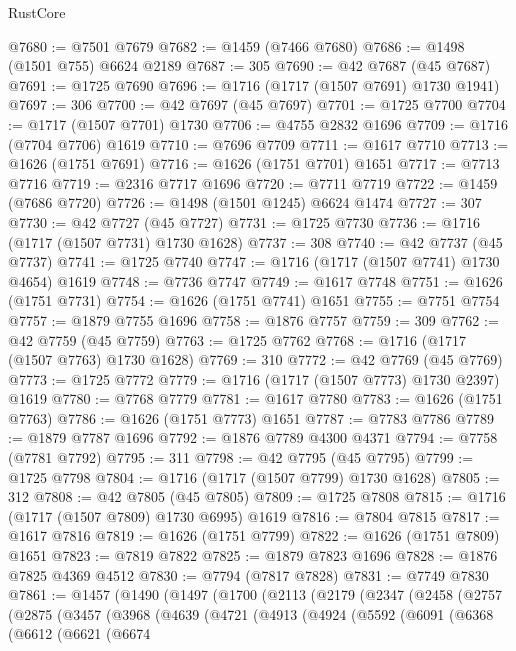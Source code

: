 \begin{lexlean}{RustCore}
\begin{coremodule}
@7680 := @7501 @7679
@7682 := @1459 (@7466 @7680)
@7686 := @1498 (@1501 @755) @6624 @2189
@7687 := 305
@7690 := @42 @7687 (@45 @7687)
@7691 := @1725 @7690
@7696 := @1716 (@1717 (@1507 @7691) @1730 @1941)
@7697 := 306
@7700 := @42 @7697 (@45 @7697)
@7701 := @1725 @7700
@7704 := @1717 (@1507 @7701) @1730
@7706 := @4755 @2832 @1696
@7709 := @1716 (@7704 @7706) @1619
@7710 := @7696 @7709
@7711 := @1617 @7710
@7713 := @1626 (@1751 @7691)
@7716 := @1626 (@1751 @7701) @1651
@7717 := @7713 @7716
@7719 := @2316 @7717 @1696
@7720 := @7711 @7719
@7722 := @1459 (@7686 @7720)
@7726 := @1498 (@1501 @1245) @6624 @1474
@7727 := 307
@7730 := @42 @7727 (@45 @7727)
@7731 := @1725 @7730
@7736 := @1716 (@1717 (@1507 @7731) @1730 @1628)
@7737 := 308
@7740 := @42 @7737 (@45 @7737)
@7741 := @1725 @7740
@7747 := @1716 (@1717 (@1507 @7741) @1730 @4654) @1619
@7748 := @7736 @7747
@7749 := @1617 @7748
@7751 := @1626 (@1751 @7731)
@7754 := @1626 (@1751 @7741) @1651
@7755 := @7751 @7754
@7757 := @1879 @7755 @1696
@7758 := @1876 @7757
@7759 := 309
@7762 := @42 @7759 (@45 @7759)
@7763 := @1725 @7762
@7768 := @1716 (@1717 (@1507 @7763) @1730 @1628)
@7769 := 310
@7772 := @42 @7769 (@45 @7769)
@7773 := @1725 @7772
@7779 := @1716 (@1717 (@1507 @7773) @1730 @2397) @1619
@7780 := @7768 @7779
@7781 := @1617 @7780
@7783 := @1626 (@1751 @7763)
@7786 := @1626 (@1751 @7773) @1651
@7787 := @7783 @7786
@7789 := @1879 @7787 @1696
@7792 := @1876 @7789 @4300 @4371
@7794 := @7758 (@7781 @7792)
@7795 := 311
@7798 := @42 @7795 (@45 @7795)
@7799 := @1725 @7798
@7804 := @1716 (@1717 (@1507 @7799) @1730 @1628)
@7805 := 312
@7808 := @42 @7805 (@45 @7805)
@7809 := @1725 @7808
@7815 := @1716 (@1717 (@1507 @7809) @1730 @6995) @1619
@7816 := @7804 @7815
@7817 := @1617 @7816
@7819 := @1626 (@1751 @7799)
@7822 := @1626 (@1751 @7809) @1651
@7823 := @7819 @7822
@7825 := @1879 @7823 @1696
@7828 := @1876 @7825 @4369 @4512
@7830 := @7794 (@7817 @7828)
@7831 := @7749 @7830
@7861 := @1457
    (@1490
      (@1497
        (@1700
          (@2113
            (@2179
              (@2347
                (@2458
                  (@2757
                    (@2875
                      (@3457
                        (@3968
                          (@4639
                            (@4721
                              (@4913
                                (@4924
                                  (@5592
                                    (@6091
                                      (@6368
                                        (@6612
                                          (@6621
                                            (@6674

\end{coremodule}
\end{lexlean}
